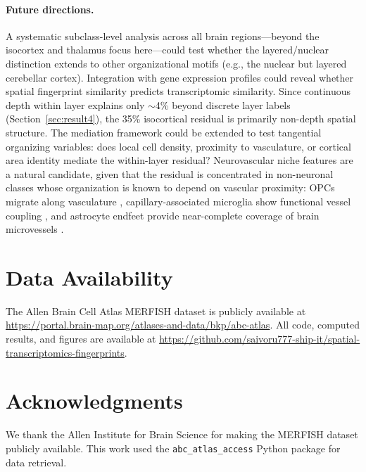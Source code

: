 \documentclass[11pt,a4paper]{article}
\begin{document}
\paragraph{Future directions.}
A systematic subclass-level analysis across all brain regions---beyond the
isocortex and thalamus focus here---could test whether the layered/nuclear
distinction extends to other organizational motifs (e.g., the nuclear but
layered cerebellar cortex). Integration with gene expression profiles could
reveal whether spatial fingerprint similarity predicts transcriptomic similarity.
Since continuous depth within layer explains only $\sim$4\% beyond discrete
layer labels (Section~\ref{sec:result4}), the 35\% isocortical residual is
primarily non-depth spatial structure. The mediation framework could be extended
to test tangential organizing variables: does local cell density, proximity to
vasculature, or cortical area identity mediate the within-layer residual?
Neurovascular niche features are a natural candidate, given that the residual
is concentrated in non-neuronal classes whose organization is known to depend
on vascular proximity: OPCs migrate along vasculature \citep{Tsai2016},
capillary-associated microglia show functional vessel coupling
\citep{Bisht2021}, and astrocyte endfeet provide near-complete coverage of
brain microvessels \citep{Mathiisen2010, Bushong2002}.


\section*{Data Availability}

The Allen Brain Cell Atlas MERFISH dataset is publicly available at
\url{https://portal.brain-map.org/atlases-and-data/bkp/abc-atlas}. All code,
computed results, and figures are available at
\url{https://github.com/saivoru777-ship-it/spatial-transcriptomics-fingerprints}.


\section*{Acknowledgments}

We thank the Allen Institute for Brain Science for making the MERFISH dataset
publicly available. This work used the \texttt{abc\_atlas\_access} Python package
for data retrieval.




\end{document}
